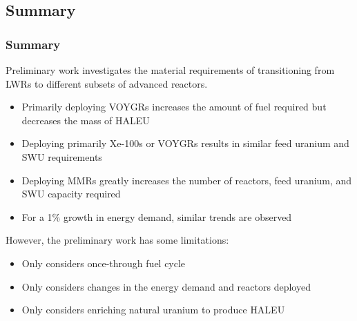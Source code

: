 \subsection{Summary}
\begin{frame}
\frametitle{Summary}
Preliminary work investigates the material requirements 
of transitioning from \glspl{LWR} to different 
subsets of advanced reactors.
\begin{itemize}
        \item Primarily deploying VOYGRs increases the amount of 
              fuel required but decreases the mass of \gls{HALEU}
        \item Deploying primarily Xe-100s or VOYGRs results in 
              similar feed uranium and \gls{SWU} requirements
        \item Deploying \glspl{MMR} greatly increases the number of 
              reactors, feed uranium, and \gls{SWU} capacity required
        \item For a 1\% growth in energy demand, similar trends are 
              observed
\end{itemize}
However, the preliminary work has some limitations:
\begin{itemize}
        \item Only considers once-through fuel cycle
        \item Only considers changes in the energy demand and
              reactors deployed
        \item Only considers enriching natural uranium to produce 
              \gls{HALEU}
\end{itemize}
\end{frame}